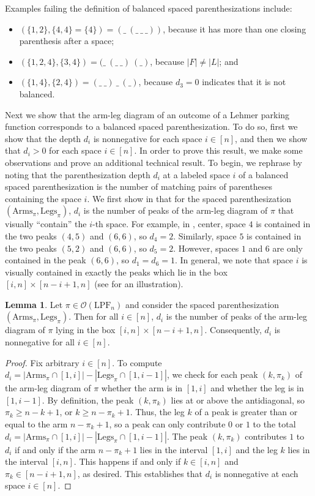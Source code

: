 \documentclass{amsart}
\newcommand{\IT}{\mathrm{LPF}}
\newcommand{\arms}{\mathrm{Arms}}
\newcommand{\legs}{\mathrm{Legs}}
\newcommand{\Out}{\mathcal{O}}
\theoremstyle{definition}
\newtheorem{lemma}[theorem]{Lemma}
\theoremstyle{definition}
\theoremstyle{remark}
\begin{document}
Examples failing the definition of balanced spaced parenthesizations include:
\begin{itemize}
    \item 
$(\{1,2\},\{4,4\}=\{4\})=(\_\ (\_\ \_\ \_))$, because it has more than one closing parenthesis after a space; 
\item $(\{1,2,4\},\{3,4\})=(\_\ (\_\ \_)\ (\_)$, because $|F|\ne|L|$; and
\item $(\{1,4\},\{2,4\})=(\_\ \_)\ \_\ (\_)$, because $d_3=0$ indicates that it is not balanced.
\end{itemize}

Next we show that the arm-leg diagram of an outcome of a Lehmer parking function corresponds to a balanced spaced parenthesization.  
To do so, first we show that the depth $d_i$ is nonnegative for each space $i\in[n]$, and then we show that $d_i>0$ for each space $i\in[n]$. 
In order to prove this result, we make some observations and prove an additional technical result. 
To begin, we rephrase  by noting that the parenthesization depth $d_i$ at a labeled space $i$ of a balanced spaced parenthesization is the number of matching pairs of parentheses containing the space $i$. 
We first show in  that for the spaced parenthesization $(\arms_\pi,\legs_\pi)$, $d_i$ is the number of peaks of the arm-leg diagram of $\pi$ that visually ``contain'' the $i$-th space. 
For example, in , center, space $4$ is contained in the two peaks $(4,5)$ and $(6,6)$, so $d_4=2$. 
Similarly, space $5$ is contained in the two peaks $(5,2)$ and $(6,6)$, so $d_5=2$. 
However, spaces $1$ and $6$ are only contained in the peak $(6,6)$, so $d_1=d_6=1$.
In general, we note that space $i$ is visually contained in exactly the peaks which lie in the box $[i,n]\times[n-i+1,n]$ (see  for an illustration).

\begin{lemma}\label{lem:d_i = leg intersections}
    Let $\pi\in \Out (\IT_n)$ and consider the spaced parenthesization $(\arms_\pi,\legs_\pi)$. Then for all $i\in [n]$, $d_i$ is the number of peaks of the arm-leg diagram of $\pi$ lying in the box $[i,n]\times[n-i+1,n]$. Consequently, $d_i$ is nonnegative for all $i\in[n]$.
\end{lemma}
\begin{proof}
    Fix arbitrary $i\in[n]$.
    To compute $d_i=|\arms_\pi\cap[1,i]|-|\legs_\pi\cap[1,i-1]|$, we check for each peak $(k,\pi_k)$ of the arm-leg diagram of $\pi$ whether the arm is in $[1,i]$ and whether the leg is in $[1,i-1]$. 
    By definition, the peak $(k,\pi_k)$ lies at or above the antidiagonal, so $\pi_k\ge n-k+1$, or $k\ge n-\pi_k+1$. Thus, the leg $k$ of a peak is greater than or equal to the arm $n-\pi_k+1$, so a peak can only contribute $0$ or $1$ to the total $d_i=|\arms_\pi\cap[1,i]|-|\legs_\pi\cap[1,i-1]|$.
    The peak $(k,\pi_k)$ contributes $1$ to $d_i$ if and only if the arm $n-\pi_k+1$ lies in the interval $[1,i]$ and the leg $k$ lies in the interval $[i,n]$. This happens if and only if $k\in[i,n]$ and $\pi_k\in[n-i+1,n]$, as desired.
    This establishes that $d_i$  is nonnegative at each space $i\in[n]$.
\end{proof}
\end{document}
